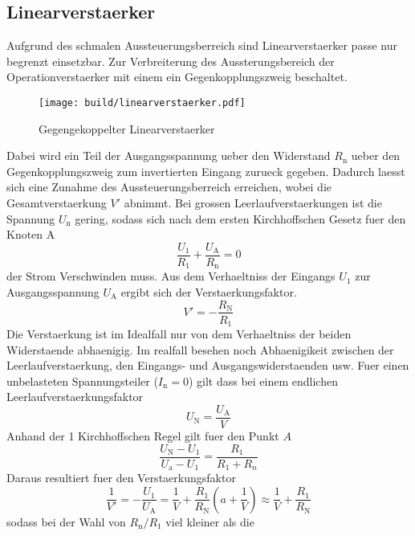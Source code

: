 \subsection{Linearverstaerker}%
\label{sub:linearverstaerker}
Aufgrund des schmalen Aussteuerungsberreich sind Linearverstaerker passe nur
begrenzt einsetzbar.
Zur Verbreiterung des Aussterungsbereich der Operationverstaerker mit einem 
ein Gegenkopplungszweig beschaltet.
\begin{figure}[h]
		\centering
		\texttt{[image: build/linearverstaerker.pdf]}
		\caption{Gegengekoppelter Linearverstaerker}
		\label{fig:lin}
\end{figure}
Dabei wird ein Teil der Ausgangsspannung ueber den Widerstand $R_\text{n}$ ueber
den Gegenkopplungszweig zum invertierten Eingang zurueck gegeben. 
Dadurch laesst sich eine Zunahme des Aussteuerungsberreich erreichen, wobei die
Gesamtverstaerkung $V'$ abnimmt.
Bei grossen Leerlaufverstaerkungen ist die Spannung $U_\text{n}$ gering, sodass
sich nach dem ersten Kirchhoffschen Gesetz fuer den Knoten A
\begin{equation}
		\frac{U_1}{R_1} + \frac{U_\text{A}}{R_\text{n}} = 0
\end{equation}
der Strom Verschwinden muss. 
Aus dem Verhaeltniss der Eingangs $U_1$ zur Ausgangsspannung $U_\text{A}$ ergibt
sich der Verstaerkungsfaktor.
\begin{equation}
		V' = - \frac{R_\text{N}}{R_1}
\end{equation}
Die Verstaerkung ist im Idealfall nur von dem Verhaeltniss der beiden
Widerstaende abhaenigig. 
Im realfall besehen noch Abhaenigikeit zwischen der Leerlaufverstaerkung, den
Eingangs- und Ausgangswiderstaenden usw. 
Fuer einen unbelasteten Spannungsteiler ($I_\text{n} = 0$) gilt dass bei einem
endlichen Leerlaufverstaerkungsfaktor
\begin{equation}
		U_\text{N} = \frac{U_\text{A}}{V}	
\end{equation}
Anhand der 1 Kirchhoffschen Regel gilt fuer den Punkt $A$
\begin{equation}
		\frac{U_\text{N}-U_1}{U_\text{a}-U_1} = \frac{R_1}{R_1 + R_n}
\end{equation}
Daraus resultiert fuer den Verstaerkungsfaktor 
\begin{equation}
		\frac{1}{V'}= - \frac{U_1}{U_\text{A}} = \frac{1}{V} +
		\frac{R_1}{R_\text{N}} \left( a + \frac{1}{V} \right) \approx
		\frac{1}{V} + \frac{R_1}{R_\text{N}}
\end{equation}
sodass bei der Wahl von $R_\text{n}/ R_\text{1}$ viel kleiner als die
